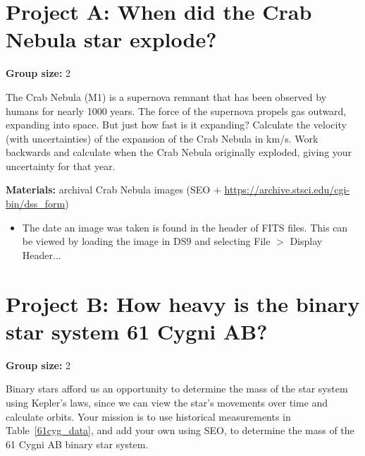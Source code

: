 \section{Project A: When did the Crab Nebula star explode?}

\textbf{Group size:} 2

The Crab Nebula (M1) is a supernova remnant that has been observed by humans for nearly 1000 years. The force of the supernova propels gas outward, expanding into space. But just how fast is it expanding? Calculate the velocity (with uncertainties) of the expansion of the Crab Nebula in km/s. Work backwards and calculate when the Crab Nebula originally exploded, giving your uncertainty for that year.

\textbf{Materials:} archival Crab Nebula images (SEO + \url{https://archive.stsci.edu/cgi-bin/dss_form})

\begin{itemize}
	\item The date an image was taken is found in the header of FITS files. This can be viewed by loading the image in DS9 and selecting File $>$ Display Header...
\end{itemize}

\section{Project B: How heavy is the binary star system 61 Cygni AB?}
\textbf{Group size:} 2

Binary stars afford us an opportunity to determine the mass of the star system using Kepler's laws, since we can view the star's movements over time and calculate orbits. Your mission is to use historical measurements in Table\ \ref{61cyg_data}, and add your own using SEO, to determine the mass of the 61 Cygni AB binary star system.

